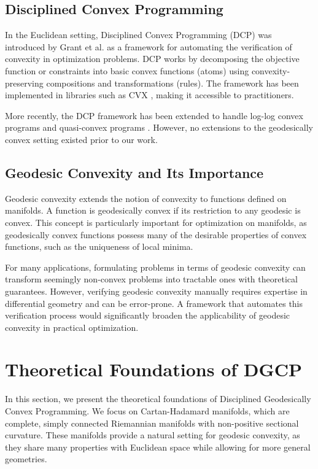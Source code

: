 \subsection{Disciplined Convex Programming}

In the Euclidean setting, Disciplined Convex Programming (DCP) was introduced by Grant et al. \cite{Grant2006} as a framework for automating the verification of convexity in optimization problems. DCP works by decomposing the objective function or constraints into basic convex functions (atoms) using convexity-preserving compositions and transformations (rules). The framework has been implemented in libraries such as CVX \cite{Diamond2016}, making it accessible to practitioners.

More recently, the DCP framework has been extended to handle log-log convex programs \cite{Agrawal2019} and quasi-convex programs \cite{Agrawal2020}. However, no extensions to the geodesically convex setting existed prior to our work.

\subsection{Geodesic Convexity and Its Importance}

Geodesic convexity extends the notion of convexity to functions defined on manifolds. A function is geodesically convex if its restriction to any geodesic is convex. This concept is particularly important for optimization on manifolds, as geodesically convex functions possess many of the desirable properties of convex functions, such as the uniqueness of local minima.

For many applications, formulating problems in terms of geodesic convexity can transform seemingly non-convex problems into tractable ones with theoretical guarantees. However, verifying geodesic convexity manually requires expertise in differential geometry and can be error-prone. A framework that automates this verification process would significantly broaden the applicability of geodesic convexity in practical optimization.

\section{Theoretical Foundations of DGCP}

In this section, we present the theoretical foundations of Disciplined Geodesically Convex Programming. We focus on Cartan-Hadamard manifolds, which are complete, simply connected Riemannian manifolds with non-positive sectional curvature. These manifolds provide a natural setting for geodesic convexity, as they share many properties with Euclidean space while allowing for more general geometries.

